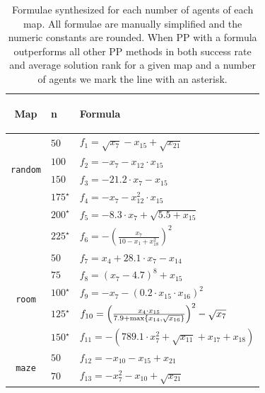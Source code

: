 \documentclass[letterpaper]{article}
\renewcommand{\max}{\operatornamewithlimits{max}\limits}
\begin{document}
\begin{table}[t!]
\caption{Formulae synthesized for each number of agents of each map. All formulae are manually simplified and the numeric constants are rounded. When PP with a formula outperforms all other PP methods in both success rate and average solution rank for a given map and a number of agents we mark the line with an asterisk.}
\label{tab:all_maps_synth_results}
\centering
{\small
\begin{adjustbox}{width=0.08\columnwidth}
\begin{tabular}{c|l|l}
\toprule
\begin{turn}{90} \textbf{Map} \end{turn} & \textbf{n} & \textbf{Formula} \\
\midrule
\multirow{4}{*}{\begin{turn}{90} {\tt random} \end{turn}}
& $ 50 $ & $ f_{1} = \sqrt{x_{7}} - x_{15} + \sqrt{x_{21}} $ \\
& $ 100 $ & $ f_{2} = - x_{7} - x_{12} \cdot x_{15} $ \\
& $ 150 $ & $ f_{3} = - 21.2 \cdot x_{7} - x_{15} $ \\
& $ 175^\star $ & $ f_{4} = -x_{7} - x_{12}^2 \cdot x_{15} $ \\
& $ 200^\star $ & $ f_{5} = - 8.3 \cdot x_{7} + \sqrt{5.5 + x_{15}} $ \\
& $ 225^\star $ & $ f_{6} = -\left(\frac{x_{7}}{10 - x_{1} + x_{18}^2}\right)^2 $ \\
\hline
\multirow{5}{*}{\begin{turn}{90} {\tt room} \end{turn}}
& $ 50 $ & $ f_{7} = x_{4} + 28.1 \cdot x_{7} - x_{14} $ \\
& $ 75 $ & $ f_{8} = \left(x_{7} - 4.7\right)^8 + x_{15} $ \\
& $ 100^\star $ & $ f_{9} = - x_{7} - \left(0.2 \cdot x_{15} \cdot x_{16}\right)^2 $ \\
& $ 125^\star $ & $ f_{10} = \left(\frac{x_{4} \cdot x_{15}}{7.9 + \max\left\{x_{14}, \sqrt{x_{16}}\right\}}\right)^2 -\sqrt{x_{7}} $ \\
& $ 150^\star $ & $ f_{11} = -(789.1 \cdot x_{7}^2 + \sqrt{x_{11}} + x_{17} + x_{18}) $ \\
\hline
\multirow{5}{*}{\begin{turn}{90} {\tt maze} \end{turn}}
& $ 50 $ & $ f_{12} = - x_{10}- x_{15} + x_{21} $ \\
& $ 70 $ & $ f_{13} = - x_{7}^2 - x_{10} + \sqrt{x_{21}} $ \\

\end{tabular}
\end{adjustbox}}
\end{table}
\end{document}
